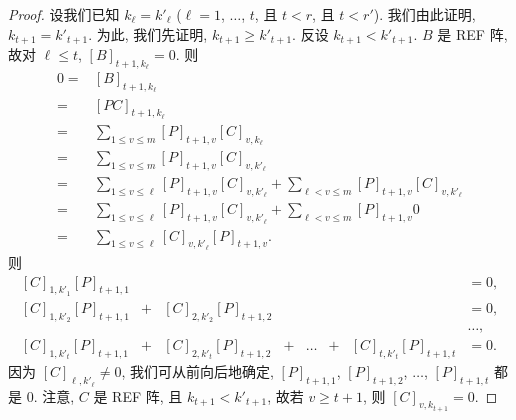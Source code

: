 \documentclass[../libro.tex]{subfiles}
\begin{document}
\begin{proof}
    设我们已知 \(k_\ell = k'_\ell\)
    (\(\ell = 1\), \(\dots\), \(t\),
    且 \(t < r\), 且 \(t < r'\)).
    我们由此证明, \(k_{t+1} = k'_{t+1}\).
    为此, 我们先证明, \(k_{t+1} \geq k'_{t+1}\).
    反设 \(k_{t+1} < k'_{t+1}\).
    \(B\) 是 REF 阵,
    故对 \(\ell \leq t\),
    \([B]_{t+1,k_\ell} = 0\).
    则
    \begin{align*}
        0
        = {} &
        [B]_{t+1,k_\ell}
        \\
        = {} &
        [P C]_{t+1,k_\ell}
        \\
        = {} &
        \sum_{1 \leq v \leq m}
        {[P]_{t+1,v} [C]_{v,k_\ell}}
        \\
        = {} &
        \sum_{1 \leq v \leq m}
        {[P]_{t+1,v} [C]_{v,k'_\ell}}
        \\
        = {} &
        \sum_{1 \leq v \leq \ell}
        {[P]_{t+1,v} [C]_{v,k'_\ell}}
        +
        \sum_{\ell < v \leq m}
        {[P]_{t+1,v} [C]_{v,k'_\ell}}
        \\
        = {} &
        \sum_{1 \leq v \leq \ell}
        {[P]_{t+1,v} [C]_{v,k'_\ell}}
        +
        \sum_{\ell < v \leq m}
        {[P]_{t+1,v} 0}
        \\
        = {} &
        \sum_{1 \leq v \leq \ell}
        {[C]_{v,k'_\ell} [P]_{t+1,v}}.
    \end{align*}
    则
    \begin{equation*}
        \begin{alignedat}{7}
            [C]_{1,k'_1} [P]_{t+1,1} &         &                          &         &       &         &                          & {} = 0, \\
            [C]_{1,k'_2} [P]_{t+1,1} & {} + {} & [C]_{2,k'_2} [P]_{t+1,2} &         &       &         &                          & {} = 0, \\
            {}                       &         &                          &         &       &         &                          & \dots,  \\
            [C]_{1,k'_t} [P]_{t+1,1} & {} + {} & [C]_{2,k'_t} [P]_{t+1,2} & {} + {} & \dots & {} + {} & [C]_{t,k'_t} [P]_{t+1,t} & {} = 0.
        \end{alignedat}
    \end{equation*}
    因为 \([C]_{\ell,k'_\ell} \neq 0\),
    我们可从前向后地确定,
    \([P]_{t+1,1}\), \([P]_{t+1,2}\), \(\dots\), \([P]_{t+1,t}\)
    都是 \(0\).
    注意, \(C\) 是 REF 阵,
    且 \(k_{t+1} < k'_{t+1}\),
    故若 \(v \geq t+1\),
    则 \([C]_{v,k_{t+1}} = 0\).

\end{proof}
\end{document}
